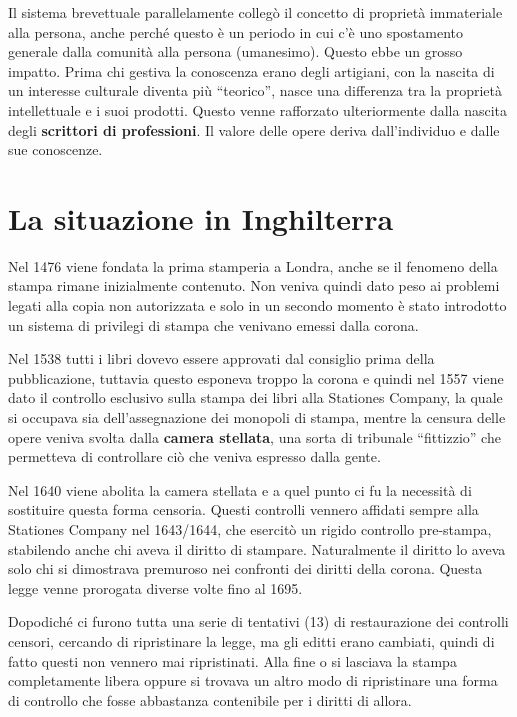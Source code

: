 Il sistema brevettuale parallelamente collegò il concetto di proprietà immateriale alla persona, anche perché questo è un periodo in cui c'è uno spostamento generale dalla comunità alla persona (umanesimo). Questo ebbe un grosso impatto. Prima chi gestiva la conoscenza erano degli artigiani, con la nascita di un interesse culturale diventa più ``teorico'', nasce una differenza tra la proprietà intellettuale e i suoi prodotti. Questo venne rafforzato ulteriormente dalla nascita degli \textbf{scrittori di professioni}. Il valore delle opere deriva dall'individuo e dalle sue conoscenze.

\section{La situazione in Inghilterra}

Nel 1476 viene fondata la prima stamperia a Londra, anche se il fenomeno della stampa rimane inizialmente contenuto. Non veniva quindi dato peso ai problemi legati alla copia non autorizzata e solo in un secondo momento è stato introdotto un sistema di privilegi di stampa che venivano emessi dalla corona. 

Nel 1538 tutti i libri dovevo essere approvati dal consiglio prima della pubblicazione, tuttavia questo esponeva troppo la corona e quindi nel 1557 viene dato il controllo esclusivo sulla stampa dei libri alla Stationes Company, la quale si occupava sia dell'assegnazione dei monopoli di stampa, mentre la censura delle opere veniva svolta dalla \textbf{camera stellata}, una sorta di tribunale ``fittizzio'' che permetteva di controllare ciò che veniva espresso dalla gente.

Nel 1640 viene abolita la camera stellata e a quel punto ci fu la necessità di sostituire questa forma censoria. Questi controlli vennero affidati sempre alla Stationes Company nel 1643/1644, che esercitò un rigido controllo pre-stampa, stabilendo anche chi aveva il diritto di stampare. Naturalmente il diritto lo aveva solo chi si dimostrava premuroso nei confronti dei diritti della corona. Questa legge venne prorogata diverse volte fino al 1695. 

Dopodiché ci furono tutta una serie di tentativi (13) di restaurazione dei controlli censori, cercando di ripristinare la legge, ma gli editti erano cambiati, quindi di fatto questi non vennero mai ripristinati. 
Alla fine o si lasciava la stampa completamente libera oppure si trovava un altro modo di ripristinare una forma di controllo che fosse abbastanza contenibile per i diritti di allora. 

